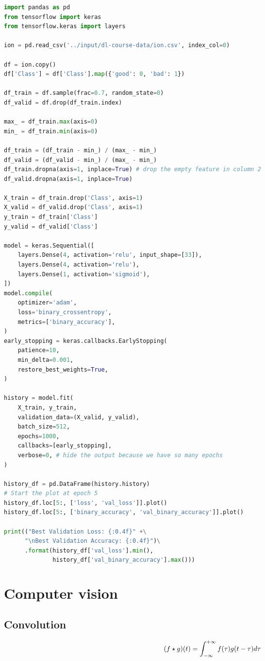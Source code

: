 \begin{lstlisting}[language=Python]
import pandas as pd
from tensorflow import keras
from tensorflow.keras import layers

ion = pd.read_csv('../input/dl-course-data/ion.csv', index_col=0)

df = ion.copy()
df['Class'] = df['Class'].map({'good': 0, 'bad': 1})

df_train = df.sample(frac=0.7, random_state=0)
df_valid = df.drop(df_train.index)

max_ = df_train.max(axis=0)
min_ = df_train.min(axis=0)

df_train = (df_train - min_) / (max_ - min_)
df_valid = (df_valid - min_) / (max_ - min_)
df_train.dropna(axis=1, inplace=True) # drop the empty feature in column 2
df_valid.dropna(axis=1, inplace=True)

X_train = df_train.drop('Class', axis=1)
X_valid = df_valid.drop('Class', axis=1)
y_train = df_train['Class']
y_valid = df_valid['Class']

model = keras.Sequential([
    layers.Dense(4, activation='relu', input_shape=[33]),
    layers.Dense(4, activation='relu'),    
    layers.Dense(1, activation='sigmoid'),
])
model.compile(
    optimizer='adam',
    loss='binary_crossentropy',
    metrics=['binary_accuracy'],
)
early_stopping = keras.callbacks.EarlyStopping(
    patience=10,
    min_delta=0.001,
    restore_best_weights=True,
)

history = model.fit(
    X_train, y_train,
    validation_data=(X_valid, y_valid),
    batch_size=512,
    epochs=1000,
    callbacks=[early_stopping],
    verbose=0, # hide the output because we have so many epochs
)

history_df = pd.DataFrame(history.history)
# Start the plot at epoch 5
history_df.loc[5:, ['loss', 'val_loss']].plot()
history_df.loc[5:, ['binary_accuracy', 'val_binary_accuracy']].plot()

print(("Best Validation Loss: {:0.4f}" +\
      "\nBest Validation Accuracy: {:0.4f}")\
      .format(history_df['val_loss'].min(), 
              history_df['val_binary_accuracy'].max()))
\end{lstlisting}

\pagebreak

\section{Computer vision}

\subsection{Convolution}
\begin{equation}
	(f \star g) (t) = \int_{-\infty}^{+\infty} f(\tau) g(t - \tau) d \tau
	\label{eq:2}
\end{equation}

